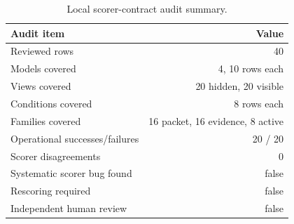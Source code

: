 \begin{table}[t]
    \centering
    \small
    \caption{Local scorer-contract audit summary.}
    \label{tab:scorer-audit-summary}
    \begin{tabular}{lr}
        \toprule
        Audit item & Value \\
        \midrule
        Reviewed rows & 40 \\
        Models covered & 4, 10 rows each \\
        Views covered & 20 hidden, 20 visible \\
        Conditions covered & 8 rows each \\
        Families covered & 16 packet, 16 evidence, 8 active \\
        Operational successes/failures & 20 / 20 \\
        Scorer disagreements & 0 \\
        Systematic scorer bug found & false \\
        Rescoring required & false \\
        Independent human review & false \\
        \bottomrule
    \end{tabular}
\end{table}
